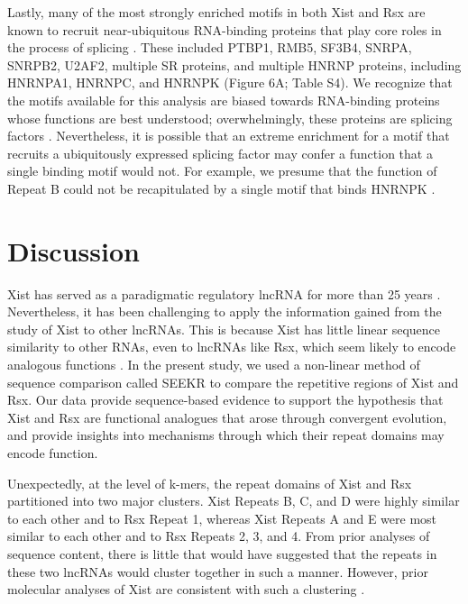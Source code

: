 Lastly, many of the most strongly enriched motifs in both Xist and Rsx are known to recruit near-ubiquitous RNA-binding proteins that play core roles in the process of splicing \cite{Wahl2015Snapshot:I}. These included PTBP1, RMB5, SF3B4, SNRPA, SNRPB2, U2AF2, multiple SR proteins, and multiple HNRNP proteins, including HNRNPA1, HNRNPC, and HNRNPK (Figure 6A; Table S4). We recognize that the motifs available for this analysis are biased towards RNA-binding proteins whose functions are best understood; overwhelmingly, these proteins are splicing factors \cite{Dominguez2018SequenceProteins,Ray2013ARegulation}. Nevertheless, it is possible that an extreme enrichment for a motif that recruits a ubiquitously expressed splicing factor may confer a function that a single binding motif would not. For example, we presume that the function of Repeat B could not be recapitulated by a single motif that binds HNRNPK \cite{Pintacuda2017HnRNPKSilencing}. 


\section{Discussion}
Xist has served as a paradigmatic regulatory lncRNA for more than 25 years \cite{Brockdorff2018LocalNcRNA,Balaton2018TheChromosome,DaRocha2017NovelConformation,Sahakyan2018TheCompensation}. Nevertheless, it has been challenging to apply the information gained from the study of Xist to other lncRNAs. This is because Xist has little linear sequence similarity to other RNAs, even to lncRNAs like Rsx, which seem likely to encode analogous functions \cite{Grant2012RsxInactivation,Wang2014Chromosome-wideDomestica}. In the present study, we used a non-linear method of sequence comparison called SEEKR \cite{Kirk2018FunctionalContent} to compare the repetitive regions of Xist and Rsx. Our data provide sequence-based evidence to support the hypothesis that Xist and Rsx are functional analogues that arose through convergent evolution, and provide insights into mechanisms through which their repeat domains may encode function. 

Unexpectedly, at the level of k-mers, the repeat domains of Xist and Rsx partitioned into two major clusters. Xist Repeats B, C, and D were highly similar to each other and to Rsx Repeat 1, whereas Xist Repeats A and E were most similar to each other and to Rsx Repeats 2, 3, and 4. From prior analyses of sequence content, there is little that would have suggested that the repeats in these two lncRNAs would cluster together in such a manner. However, prior molecular analyses of Xist are consistent with such a clustering \cite{Brockdorff2018LocalNcRNA,Balaton2018TheChromosome,DaRocha2017NovelConformation,Sahakyan2018TheCompensation}. 

